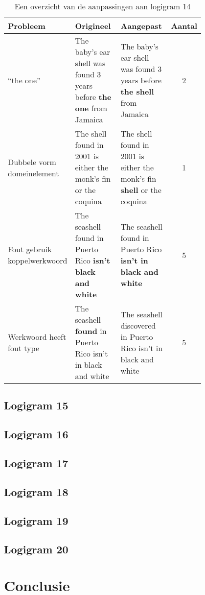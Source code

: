 \begin{table}[h]
  \centering
  \begin{tabular}{p{0.2\linewidth}p{0.3\linewidth}p{0.3\linewidth}c}
    \toprule
    \textbf{Probleem} & \textbf{Origineel} & \textbf{Aangepast} & \textbf{Aantal} \\ 
    \hline
    ``the one'' & The baby's ear shell was found 3 years before \textbf{the one} from Jamaica & The baby's ear shell was found 3 years before \textbf{the shell} from Jamaica & 2 \\
    \hline
    Dubbele vorm domeinelement & The shell found in 2001 is either the monk's fin or the coquina & The shell found in 2001 is either the monk's fin \textbf{shell} or the coquina & 1 \\
    \hline
    Fout gebruik koppelwerkwoord & The seashell found in Puerto Rico \textbf{isn't black and white} & The seashell found in Puerto Rico \textbf{isn't in black and white} & 5 \\
    \hline
    Werkwoord heeft fout type & The seashell \textbf{found} in Puerto Rico isn't in black and white & The seashell \textbf{}discovered in Puerto Rico isn't in black and white & 5 \\ 
    \bottomrule
  \end{tabular}
  \caption{Een overzicht van de aanpassingen aan logigram 14}
  \label{tbl:log14}
\end{table}

\subsection{Logigram 15}
\subsection{Logigram 16}
\subsection{Logigram 17}
\subsection{Logigram 18}
\subsection{Logigram 19}
\subsection{Logigram 20}


\section{Conclusie}
